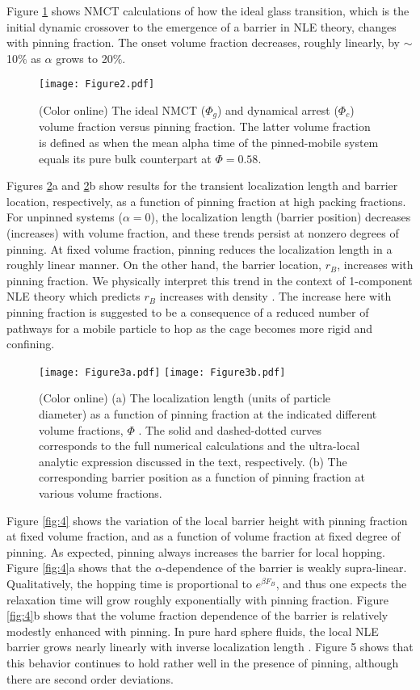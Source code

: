 \documentclass[twocolumn,showpacs,preprintnumbers,amsmath,amssymb,unsortedaddress,
]{revtex4-1}
\begin{document}
Figure \ref{fig:2} shows NMCT calculations of how the ideal glass transition, which is the initial dynamic crossover to the emergence of a barrier in NLE theory, changes with pinning fraction. The onset volume fraction decreases, roughly linearly, by $\sim$ 10$\%$ as $\alpha$ grows to 20$\%$.

\begin{figure}[htp]
\center
\texttt{[image: Figure2.pdf]}
\caption{\label{fig:2}(Color online) The ideal NMCT ($\Phi_g$) and dynamical arrest ($\Phi_c$) volume fraction versus pinning fraction. The latter volume fraction is defined as when the mean alpha time of the pinned-mobile system equals its pure bulk counterpart at $\Phi=0.58$.}
\end{figure}

Figures \ref{fig:3}a and \ref{fig:3}b show results for the transient localization length and barrier location, respectively, as a function of pinning fraction at high packing fractions. For unpinned systems ($\alpha=0$), the localization length (barrier position) decreases (increases) with volume fraction, and these trends persist at nonzero degrees of pinning. At fixed volume fraction, pinning reduces the localization length in a roughly linear manner. On the other hand, the barrier location, $r_B$, increases with pinning fraction. We physically interpret this trend in the context of 1-component NLE theory which predicts $r_B$
increases with density \cite{10,33}. The increase here with pinning fraction is suggested to be a consequence of a reduced number of pathways for a mobile particle to hop as the cage becomes more rigid and confining.
 
\begin{figure}[htp]
\center
\texttt{[image: Figure3a.pdf]}
\texttt{[image: Figure3b.pdf]}
\caption{\label{fig:3}(Color online) (a) The localization length (units of particle diameter) as a function of pinning fraction at the indicated different volume fractions, $\Phi$ . The solid and dashed-dotted curves corresponds to the full numerical calculations and the ultra-local analytic expression discussed in the text, respectively. (b) The corresponding barrier position as a function of pinning fraction at various volume fractions.}
\end{figure}

Figure \ref{fig:4} shows the variation of the local barrier height with pinning fraction at fixed volume fraction, and as a function of volume fraction at fixed degree of pinning. As expected, pinning always increases the barrier for local hopping. Figure \ref{fig:4}a shows that the $\alpha$-dependence of the barrier is weakly supra-linear. Qualitatively, the hopping time is proportional to $e^{\beta F_B}$, and thus one expects the relaxation time will grow roughly exponentially with pinning fraction. Figure \ref{fig:4}b shows that the volume fraction dependence of the barrier is relatively modestly enhanced with pinning. In pure hard sphere fluids, the local NLE barrier grows nearly linearly with inverse localization length \cite{7,33,45}. Figure 5 shows that this behavior continues to hold rather well in the presence of pinning, although there are second order deviations. 
\end{document}
